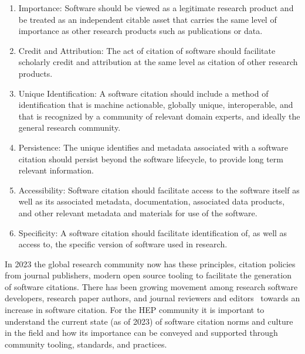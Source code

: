 \begin{enumerate}
    \item Importance: Software should be viewed as a legitimate research product and be treated as an independent citable asset that carries the same level of importance as other research products such as publications or data.
    \item Credit and Attribution: The act of citation of software should facilitate scholarly credit and attribution at the same level as citation of other research products.
    \item Unique Identification: A software citation should include a method of identification that is machine actionable, globally unique, interoperable, and that is recognized by a community of relevant domain experts, and ideally the general research community.
    \item Persistence: The unique identifies and metadata associated with a software citation should persist beyond the software lifecycle, to provide long term relevant information.
    \item Accessibility: Software citation should facilitate access to the software itself as well as its associated metadata, documentation, associated data products, and other relevant metadata and materials for use of the software.
    \item Specificity: A software citation should facilitate identification of, as well as access to, the specific version of software used in research.
\end{enumerate}

In 2023 the global research community now has these principles, citation policies from journal publishers, modern open source tooling to facilitate the generation of software citations.
There has been growing movement among research software developers, research paper authors, and journal reviewers and editors~\cite{smith_journal_2018} towards an increase in software citation.
For the HEP community it is important to understand the current state (as of 2023) of software citation norms and culture in the field and how its importance can be conveyed and supported through community tooling, standards, and practices.

